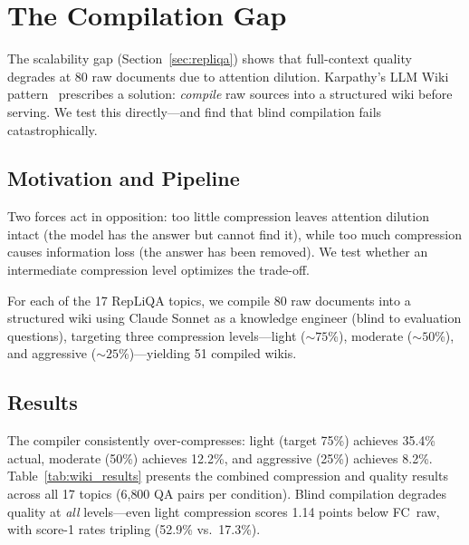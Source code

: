 \documentclass{article}
\begin{document}
\section{The Compilation Gap}
\label{sec:wiki}

The scalability gap (Section~\ref{sec:repliqa}) shows that full-context
quality degrades at 80 raw documents due to attention dilution.
Karpathy's LLM Wiki pattern~\cite{karpathy2026llmwiki} prescribes a
solution: \emph{compile} raw sources into a structured wiki before
serving. We test this directly---and find that blind compilation fails
catastrophically.

\subsection{Motivation and Pipeline}

Two forces act in opposition: too little compression leaves attention
dilution~\cite{liu2024lost} intact (the model has the answer but cannot
find it), while too much compression causes information loss (the answer
has been removed). We test whether an intermediate compression level
optimizes the trade-off.

For each of the 17 RepLiQA topics, we compile 80 raw documents into a
structured wiki using Claude Sonnet as a knowledge engineer (blind to
evaluation questions), targeting three compression levels---light
(${\sim}75$\%), moderate (${\sim}50$\%), and aggressive
(${\sim}25$\%)---yielding 51 compiled wikis.

\subsection{Results}

The compiler consistently over-compresses: light (target 75\%) achieves
35.4\% actual, moderate (50\%) achieves 12.2\%, and aggressive (25\%)
achieves 8.2\%. Table~\ref{tab:wiki_results} presents the combined
compression and quality results across all 17 topics (6{,}800 QA pairs per
condition). Blind compilation degrades quality at \emph{all} levels---even
light compression scores 1.14 points below FC~raw, with score-1 rates
tripling (52.9\% vs.\ 17.3\%).
\end{document}
